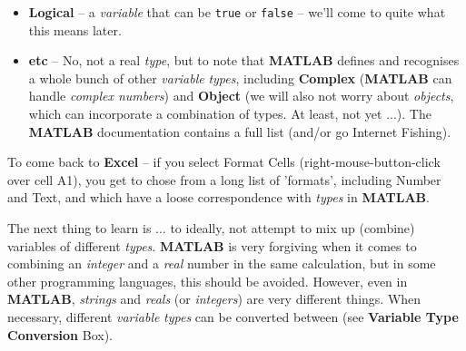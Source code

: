 \documentclass{tufte-book} %
\begin{document}
\begin{itemize}
\item \textbf{Logical} -- a \textit{variable} that can be \texttt{true} or \texttt{false} -- we'll come to quite what this means later.

\item \textbf{etc} -- No, not a real \textit{type}, but to note that \textbf{MATLAB} defines and recognises a whole bunch of other \textit{variable} \textit{types}, including \textbf{Complex} (\textbf{MATLAB} can handle \textit{complex numbers}) and \textbf{Object} (we will also not worry about \textit{objects}, which can incorporate a combination of types. At least, not yet ...). The \textbf{MATLAB} documentation contains a full list (and/or go Internet Fishing).

\end{itemize}

To come back to \textbf{Excel} -- if you select \textsf{Format Cells} (right-mouse-button-click over cell A1), you get to chose from a long list of 'formats', including \textsf{Number} and \textsf{Text}, and which have a loose correspondence with \textit{types} in \textbf{MATLAB}.

The next thing to learn is ... to ideally, not attempt to mix up (combine) variables of different \textit{types}. \textbf{MATLAB} is very forgiving when it comes to combining an \textit{integer} and a \textit{real} number in the same calculation, but in some other programming languages, this should be avoided.
However, even in \textbf{MATLAB}, \textit{strings} and \textit{reals} (or \textit{integers}) are very different things. When necessary, different \textit{variable} \textit{types} can be converted between (see \textbf{Variable Type Conversion} Box).
\end{document}
